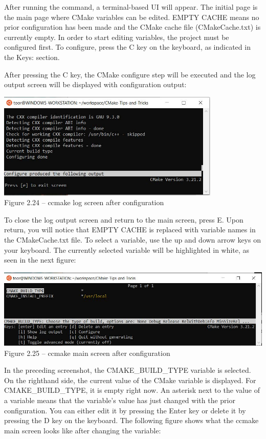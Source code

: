After running the command, a terminal-based UI will appear. The initial page is the main page where CMake variables can be edited. EMPTY CACHE means no prior configuration has been made and the CMake cache file (CMakeCache.txt) is currently empty. In order to start editing variables, the project must be configured first. To configure, press the C key on the keyboard, as indicated in the Keys: section.

After pressing the C key, the CMake configure step will be executed and the log output screen will be displayed with configuration output:

\begin{center}
\includegraphics[width=0.8\textwidth]{content/1/chapter2/images/24.jpg}\\
Figure 2.24 – ccmake log screen after configuration
\end{center}

To close the log output screen and return to the main screen, press E. Upon return, you will notice that EMPTY CACHE is replaced with variable names in the CMakeCache.txt file. To select a variable, use the up and down arrow keys on your keyboard. The currently selected variable will be highlighted in white, as seen in the next figure:

\begin{center}
\includegraphics[width=1.\textwidth]{content/1/chapter2/images/25.jpg}\\
Figure 2.25 – ccmake main screen after configuration
\end{center}

In the preceding screenshot, the CMAKE\_BUILD\_TYPE variable is selected. On the righthand side, the current value of the CMake variable is displayed. For CMAKE\_BUILD\_TYPE, it is empty right now. An asterisk next to the value of a variable means that the variable's value has just changed with the prior configuration. You can either edit it by pressing the Enter key or delete it by pressing the D key on the keyboard. The following figure shows what the ccmake main screen looks like after changing the variable:

